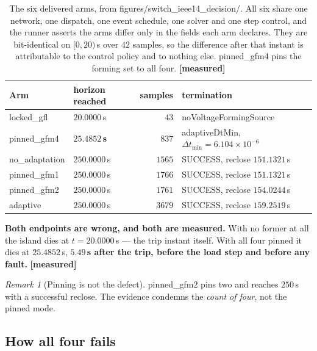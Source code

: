 \documentclass[12pt,a4paper]{article}
\theoremstyle{remark}
\newtheorem{remark}{Remark}
\newcommand{\code}[1]{{\ttfamily\small\hyphenchar\font=-1 #1}}
\newcommand{\measured}{\textcolor{ok}{\textbf{[measured]}}}
\begin{document}
\begin{table}[H]
\centering
\small
\begin{tabular}{@{}llrl@{}}
\toprule
\textbf{Arm} & \textbf{horizon reached} & \textbf{samples} & \textbf{termination}\\
\midrule
\code{locked\_gfl}     & $20.0000$\,s & $43$       & \code{noVoltageFormingSource}\\
\code{pinned\_gfm4}    & \textcolor{no}{$\mathbf{25.4852}$\,\textbf{s}} & $837$ & \code{adaptiveDtMin}, $\Delta t_{\min}=6.104\times10^{-6}$\\
\code{no\_adaptation}  & $250.0000$\,s & $1565$   & \code{SUCCESS}, reclose $151.1321$\,s\\
\code{pinned\_gfm1}    & $250.0000$\,s & $1766$   & \code{SUCCESS}, reclose $151.1321$\,s\\
\code{pinned\_gfm2}    & $250.0000$\,s & $1761$   & \code{SUCCESS}, reclose $154.0244$\,s\\
\code{adaptive}        & $250.0000$\,s & $3679$   & \code{SUCCESS}, reclose $159.2519$\,s\\
\bottomrule
\end{tabular}
\caption{The six delivered arms, from
\code{figures/switch\_ieee14\_decision/}\allowbreak\code{comparison\_summary.tex}.
All six share one network, one dispatch, one event schedule, one solver and one
step control, and the runner asserts the arms differ only in the fields each arm
declares. They are bit-identical on $[0,20)$\,s over $42$ samples, so the
difference after that instant is attributable to the control policy and to
nothing else. \code{pinned\_gfm4} pins the forming set to all four. \measured}
\label{tab:armcmp}
\end{table}

\textbf{Both endpoints are wrong, and both are measured.} With no former at all
the island dies at $t=20.0000$\,s --- the trip instant itself. With all four
pinned it dies at $25.4852$\,s, \textbf{$5.49$\,s after the trip, before the load
step and before any fault.} \measured

\begin{remark}[Pinning is not the defect]
\code{pinned\_gfm2} pins two and reaches $250$\,s with a successful reclose. The
evidence condemns the \emph{count of four}, not the pinned mode.
\end{remark}

\subsection{How all four fails}
\end{document}
